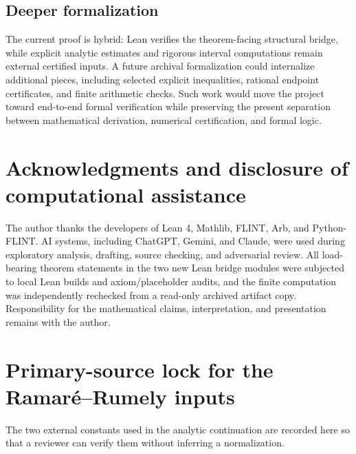 \documentclass[11pt]{article}
\theoremstyle{definition}
\begin{document}
\subsection{Deeper formalization}

The current proof is hybrid: Lean verifies the theorem-facing structural bridge, while explicit analytic estimates and rigorous interval computations remain external certified inputs. A future archival formalization could internalize additional pieces, including selected explicit inequalities, rational endpoint certificates, and finite arithmetic checks. Such work would move the project toward end-to-end formal verification while preserving the present separation between mathematical derivation, numerical certification, and formal logic.

\section*{Acknowledgments and disclosure of computational assistance}

The author thanks the developers of Lean 4, Mathlib, FLINT, Arb, and Python-FLINT. AI systems, including ChatGPT, Gemini, and Claude, were used during exploratory analysis, drafting, source checking, and adversarial review. All load-bearing theorem statements in the two new Lean bridge modules were subjected to local Lean builds and axiom/placeholder audits, and the finite computation was independently rechecked from a read-only archived artifact copy. Responsibility for the mathematical claims, interpretation, and presentation remains with the author.

\appendix

\section{Primary-source lock for the Ramar\'{e}--Rumely inputs}\label{app:rrlock}

The two external constants used in the analytic continuation are recorded here so that a reviewer can verify them without inferring a normalization.
\end{document}
